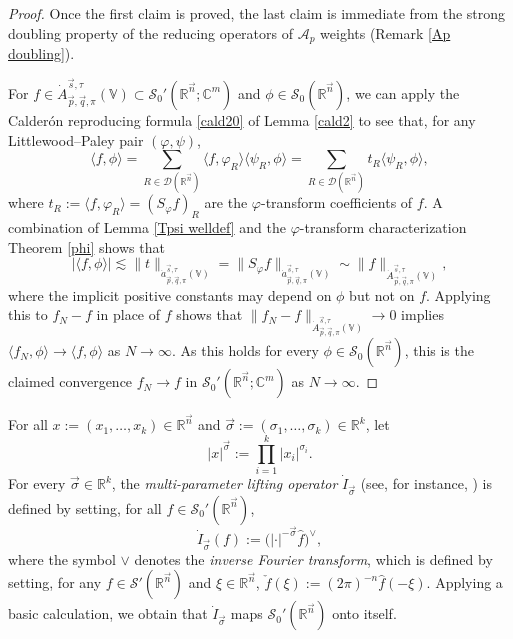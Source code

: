 \documentclass[11pt, reqno]{amsart}
\theoremstyle{definition}
\theoremstyle{remark}
\numberwithin{equation}{section}
\newcommand{\A}{\mathscr A}
\newcommand{\C}{\mathbb C}
\newcommand{\D}{\mathscr D}
\newcommand{\R}{\mathbb R}
\newcommand{\Sc}{\mathscr S}
\newcommand{\V}{\mathbb V}
\newcommand{\vn}{\vec n}
\newcommand{\vp}{\vec p}
\newcommand{\vq}{\vec q}
\newcommand{\vs}{\vec s}
\newcommand{\Atau}{\dot A^{\vs,\tau}_{\vp,\vq,\pi}}
\newcommand{\atau}{\dot a^{\vs,\tau}_{\vp,\vq,\pi}}
\newcommand{\pair}[2]{\langle #1, #2 \rangle}
\newcommand{\abs}[1]{|#1|}
\newcommand{\Norm}[2]{\|#1\|_{#2}}
\begin{document}
\begin{proof}
Once the first claim is proved, the last claim is immediate from the strong doubling property of the reducing operators of $\A_p$ weights (Remark \ref{Ap doubling}).

For $f\in\Atau(\V)\subset\Sc_0'(\R^{\vn};\C^m)$ and $\phi\in\Sc_0(\R^{\vn})$, we can apply the Calder\'on reproducing formula \eqref{cald20} of Lemma \ref{cald2} to see that, for any Littlewood--Paley pair $(\varphi,\psi)$,
\begin{equation*}
\pair{f}{\phi}
=\sum_{R\in\D(\R^{\vn})}\pair{f}{\varphi_R}\pair{\psi_R}{\phi}
=\sum_{R\in\D(\R^{\vn})}t_R\pair{\psi_R}{\phi},
\end{equation*}
where $t_R:=\pair{f}{\varphi_R}=(S_\varphi f)_R$ are the $\varphi$-transform coefficients of $f$. A combination of Lemma \ref{Tpsi welldef} and the $\varphi$-transform characterization Theorem \ref{phi} shows that
\begin{equation*}
\abs{\pair{f}{\phi}}
\lesssim\Norm{t}{\atau(\V)}
=\Norm{S_\varphi f}{\atau(\V)}
\sim\Norm{f}{\Atau(\V)},
\end{equation*}
where the implicit positive constants may depend on $\phi$ but not on $f$. Applying this to $f_N-f$ in place of $f$ shows that $\Norm{f_N-f}{\Atau(\V)}\to 0$ implies $\pair{f_N}{\phi}\to\pair{f}{\phi}$ as $N\to\infty$.
As this holds for every $\phi\in\Sc_0(\R^{\vn})$, this is the claimed convergence $f_N\to f$ in $\Sc_0'(\R^{\vn};\C^m)$ as $N\to\infty$.
\end{proof}

For all $x:=(x_1,\ldots,x_k)\in\mathbb R^{\vec n}$
and $\vec\sigma:=(\sigma_1,\ldots,\sigma_k)\in\mathbb R^k$, let
$$
|x|^{\vec\sigma}:=\prod_{i=1}^k|x_i|^{\sigma_i}.
$$
For every $\vec\sigma\in\mathbb R^k$,
the \emph{multi-parameter lifting operator} $\dot I_{\vec\sigma}$
(see, for instance, \cite[Section 5.2.3]{Tri83})
is defined by setting, for all $f\in \mathscr S_0'(\mathbb R^{\vec n})$,
\begin{equation}\label{lift}
\dot I_{\vec\sigma}(f):=\Big(|\cdot|^{-\vec\sigma}
\widehat{f}\Big)^{\vee},
\end{equation}
where the symbol $\vee$ denotes the \emph{inverse Fourier transform},
which is defined by setting, for any $f\in\mathscr S'(\R^{\vn})$ and $\xi\in\R^{\vn}$,
$\check{f}(\xi):=(2\pi)^{-n}\widehat{f}(-\xi)$.
Applying a basic calculation, we obtain that $\dot I_{\vec\sigma}$ maps
$\mathscr S_0'(\mathbb R^{\vec n})$ onto itself.
\end{document}
